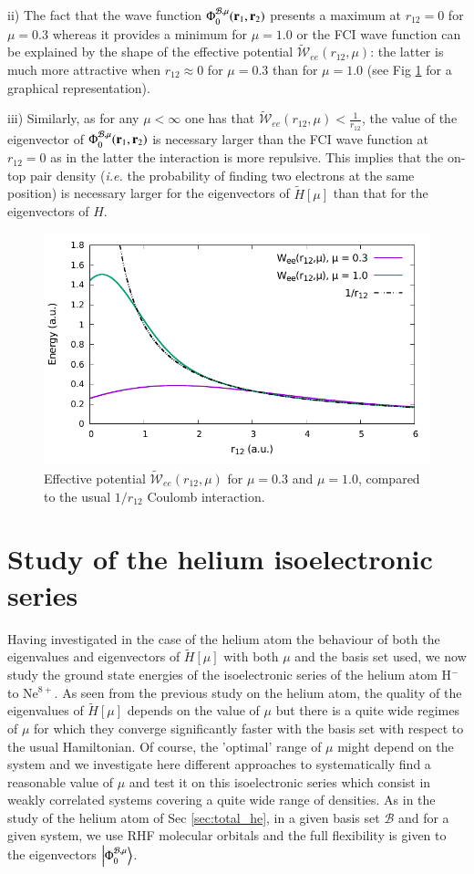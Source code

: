 \documentclass[aip,jcp,reprint,noshowkeys,superscriptaddress]{revtex4-1}
\newcommand{\br}[0]{{\bf {r}}}
\newcommand{\phimub}[0]{\Phi^{\mathcal{B},\mu}_0}
\newcommand{\basis}[0]{\mathcal{B}}
\begin{document}
ii) The fact that the wave function $\phimub(\br{}_1,\br{}_2)$ presents a maximum at $r_{12}=0$ for $\mu=0.3$ whereas it provides a minimum for $\mu=1.0$ or the FCI wave function can be explained by the shape of the effective potential $\tilde{\mathcal{W}}_{ee}(r_{12},\mu)$: the latter is much more attractive when $r_{12}\approx 0$ for $\mu=0.3$ than for $\mu = 1.0$ (see Fig \ref{fig_wee_compare} for a graphical representation). 

iii) Similarly, as for any $\mu < \infty$ one has that $\tilde{\mathcal{W}}_{ee}(r_{12},\mu) <\frac{1}{r_{12}}$, the value of the eigenvector of $\phimub(\br{}_1,\br{}_2)$ is necessary larger than the FCI wave function at $r_{12}=0$ as in the latter the interaction is more repulsive. This implies that the on-top pair density (\textit{i.e.} the probability of finding two electrons at the same position) is necessary larger for the eigenvectors of $\tilde{H}[\mu]$ than that for the eigenvectors of $H$.

\begin{figure}
 \label{fig_wee_compare}
        \includegraphics[width=0.45\linewidth]{plots/jastrow/w_ee_zoom.pdf}
        \caption{
        Effective potential $\tilde{\mathcal{W}}_{ee}(r_{12},\mu)$ for $\mu=0.3$ and $\mu=1.0$, compared to the usual $1/r_{12}$ Coulomb interaction.}
\end{figure}

\section{Study of the helium isoelectronic series}
\label{sec:iso_elec}
Having investigated in the case of the helium atom the behaviour of both the eigenvalues and eigenvectors of $\tilde{H}[\mu]$ with both $\mu$ and the basis set used, we now study the ground state energies of the isoelectronic series of the helium atom H$^{-}$ to Ne$^{8+}$. As seen from the previous study on the helium atom, the quality of the eigenvalues of $\tilde{H}[\mu]$ depends on the value of $\mu$ but there is a quite wide regimes of $\mu$ for which they converge significantly faster with the basis set with respect to the usual Hamiltonian. Of course, the 'optimal' range of $\mu$ might depend on the system and we investigate here different approaches to systematically find a reasonable value of $\mu$ and test it on this isoelectronic series which consist in weakly correlated systems covering a quite wide range of densities. 
As in the study of the helium atom of Sec \ref{sec:total_he}, in a given basis set $\basis$ and for a given system, we use RHF molecular orbitals and the full flexibility is given to the eigenvectors $\ket{\phimub}$. 
\end{document}
